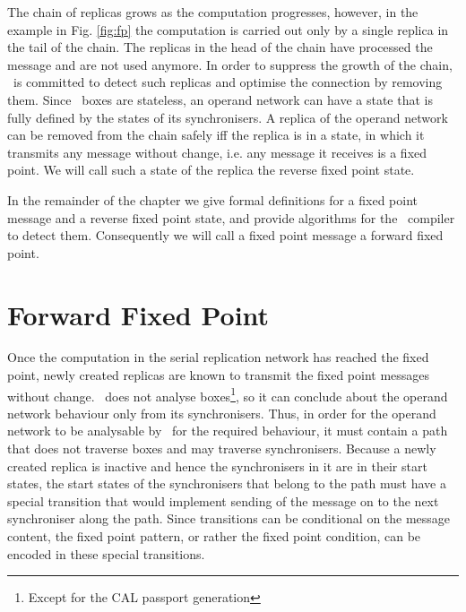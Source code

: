 The chain of replicas grows as the computation progresses, however, in the example in Fig. \ref{fig:fp} the computation is carried out only by a single replica in the tail of the chain. The replicas in the head of the chain have processed the message and are not used anymore. In order to suppress the growth of the chain, \ak\ is committed to detect such replicas and optimise the connection by removing them. Since \ak\ boxes are stateless, an operand network can have a state that is fully defined by the states of its synchronisers. A replica of the operand network can be removed from the chain safely iff the replica is in a state, in which it transmits any message without change, i.e. any message it receives is a fixed point. We will call such a state of the replica the reverse fixed point state.

In the remainder of the chapter we give formal definitions for a fixed point message and a reverse fixed point state, and provide algorithms for the \ak\ compiler to detect them. Consequently we will call a fixed point message a forward fixed point.


    \section{Forward Fixed Point}
Once the computation in the serial replication network has reached the fixed point, newly created replicas are known to transmit the fixed point messages without change. \ak\ does not analyse boxes\footnote{Except for the CAL passport generation}, so it can conclude about the operand network behaviour only from its synchronisers. Thus, in order for the operand network to be analysable by \ak\ for the required behaviour, it must contain a path that does not traverse boxes and may traverse synchronisers. Because a newly created replica is inactive and hence the synchronisers in it are in their start states, the start states of the synchronisers that belong to the path must have a special transition that would implement sending of the message on to the next synchroniser along the path. Since transitions can be conditional on the message content, the fixed point pattern, or rather the fixed point condition, can be encoded in these special transitions.

